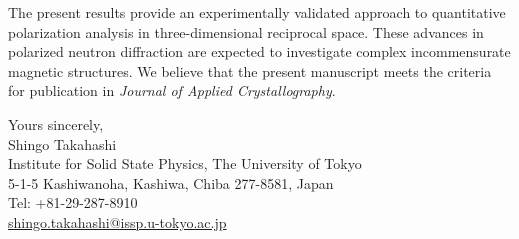 \documentclass[11pt,a4paper]{article}
\makeatletter
\newcommand{\JournalName}{Journal of Applied Crystallography}
\newcommand{\AuthorName}{Shingo Takahashi}
\newcommand{\Affiliation}{Institute for Solid State Physics, The University of Tokyo}
\newcommand{\PostalAddress}{5-1-5 Kashiwanoha, Kashiwa, Chiba 277-8581, Japan}
\newcommand{\PhoneNumber}{+81-29-287-8910}
\newcommand{\EmailAddress}{shingo.takahashi@issp.u-tokyo.ac.jp}
\makeatother
\begin{document}
The present results provide an experimentally validated approach to quantitative polarization analysis in three-dimensional reciprocal space.
These advances in polarized neutron diffraction are expected to investigate complex incommensurate magnetic structures.
We believe that the present manuscript meets the criteria for publication in \textit{\JournalName}.

\vspace{4pt}
\noindent\begin{minipage}{\textwidth}
\raggedleft
Yours sincerely,\\[4pt]
\AuthorName\\[7pt]
\Affiliation\\
\PostalAddress\\
Tel: \PhoneNumber\\
\href{mailto:\EmailAddress}{\EmailAddress}
\end{minipage}
\end{document}
